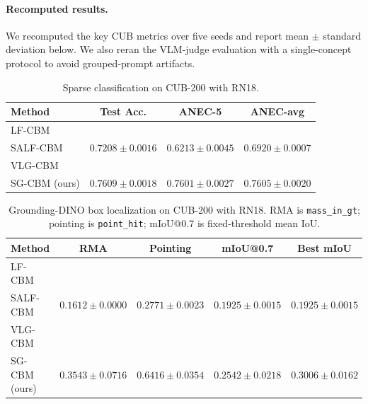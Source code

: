 
\paragraph{Recomputed results.}
We recomputed the key CUB metrics over five seeds and report mean $\pm$ standard deviation below. We also reran the VLM-judge evaluation with a single-concept protocol to avoid grouped-prompt artifacts.

\begin{table}[h]
\centering
\small
\caption{Sparse classification on CUB-200 with RN18.}
\begin{tabular}{lccc}
\toprule
Method & Test Acc. & ANEC-5 & ANEC-avg \\
\midrule
LF-CBM &  &  &  \\
SALF-CBM & $0.7208 \pm 0.0016$ & $0.6213 \pm 0.0045$ & $0.6920 \pm 0.0007$ \\
VLG-CBM &  &  &  \\
SG-CBM (ours) & $0.7609 \pm 0.0018$ & $0.7601 \pm 0.0027$ & $0.7605 \pm 0.0020$ \\
\bottomrule
\end{tabular}
\end{table}

\begin{table}[h]
\centering
\small
\caption{Grounding-DINO box localization on CUB-200 with RN18. RMA is \texttt{mass\_in\_gt}; pointing is \texttt{point\_hit}; mIoU@0.7 is fixed-threshold mean IoU.}
\begin{tabular}{lcccc}
\toprule
Method & RMA & Pointing & mIoU@0.7 & Best mIoU \\
\midrule
LF-CBM &  &  &  &  \\
SALF-CBM & $0.1612 \pm 0.0000$ & $0.2771 \pm 0.0023$ & $0.1925 \pm 0.0015$ & $0.1925 \pm 0.0015$ \\
VLG-CBM &  &  &  &  \\
SG-CBM (ours) & $0.3543 \pm 0.0716$ & $0.6416 \pm 0.0354$ & $0.2542 \pm 0.0218$ & $0.3006 \pm 0.0162$ \\
\bottomrule
\end{tabular}
\end{table}

